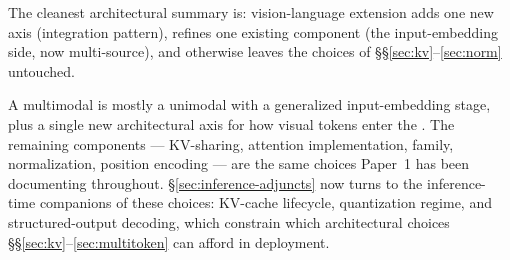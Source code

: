 The cleanest architectural summary is: vision-language extension
adds one new axis (integration pattern), refines one existing
component (the input-embedding side, now multi-source), and otherwise
leaves the choices of \S\S\ref{sec:kv}--\ref{sec:norm} untouched.

\medskip

A multimodal  is mostly a unimodal  with a generalized
input-embedding stage, plus a single new architectural axis for how
visual tokens enter the . The remaining components ---
KV-sharing, attention implementation,  family, normalization,
position encoding --- are the same choices Paper~1 has been
documenting throughout. \S\ref{sec:inference-adjuncts} now turns to
the inference-time companions of these choices: KV-cache lifecycle,
quantization regime, and structured-output decoding, which constrain
which architectural choices §§\ref{sec:kv}--\ref{sec:multitoken} can
afford in deployment.
